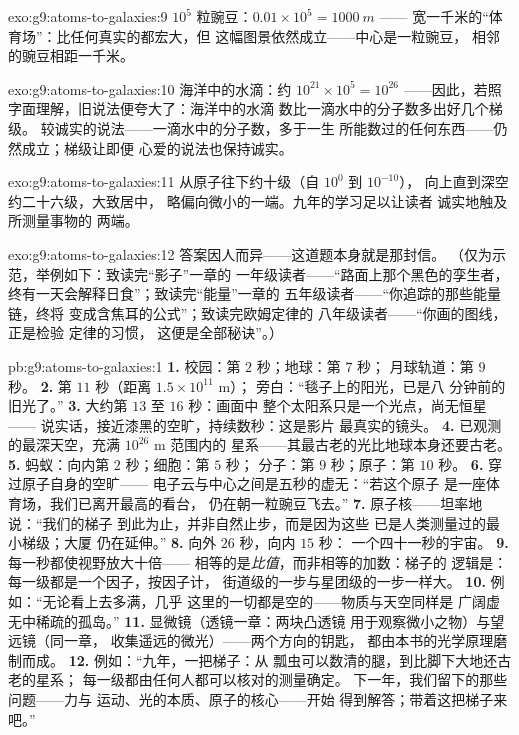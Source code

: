 \begin{solution}{exo:g9:atoms-to-galaxies:9}
$10^{5}$ 粒豌豆：$0.01 \times 10^{5} = \qty{1000}{m}$ ——
宽一千米的“体育场”：比任何真实的都宏大，但
这幅图景依然成立——中心是一粒豌豆，
相邻的豌豆相距一千米。
\end{solution}

\begin{solution}{exo:g9:atoms-to-galaxies:10}
海洋中的水滴：约 $10^{21} \times 10^{5} = 10^{26}$
——因此，若照字面理解，旧说法便夸大了：海洋中的水滴
数比一滴水中的分子数多出好几个梯级。
较诚实的说法——一滴水中的分子数，多于一生
所能数过的任何东西——仍然成立；梯级让即便
心爱的说法也保持诚实。
\end{solution}

\begin{solution}{exo:g9:atoms-to-galaxies:11}
从原子往下约十级（自 $10^{0}$ 到 $10^{-10}$），
向上直到深空约二十六级，大致居中，
略偏向微小的一端。九年的学习足以让读者
诚实地触及所测量事物的
两端。
\end{solution}

\begin{solution}{exo:g9:atoms-to-galaxies:12}
答案因人而异——这道题本身就是那封信。
（仅为示范，举例如下：致读完“影子”一章的
一年级读者——“路面上那个黑色的孪生者，
终有一天会解释日食”；致读完“能量”一章的
五年级读者——“你追踪的那些能量链，终将
变成含焦耳的公式”；致读完欧姆定律的
八年级读者——“你画的图线，正是检验
定律的习惯，
这便是全部秘诀”。）
\end{solution}

\begin{solution}{pb:g9:atoms-to-galaxies:1}
\textbf{1.} 校园：第 $2$ 秒；地球：第 $7$ 秒；
月球轨道：第 $9$ 秒。
\textbf{2.} 第 $11$ 秒（距离 $1.5 \times 10^{11}$ \unit{m}）；
旁白：“毯子上的阳光，已是八
分钟前的旧光了。”
\textbf{3.} 大约第 $13$ 至 $16$ 秒：画面中
整个太阳系只是一个光点，尚无恒星——
说实话，接近漆黑的空旷，持续数秒：这是影片
最真实的镜头。
\textbf{4.} 已观测的最深天空，充满 $10^{26}$ \unit{m} 范围内的
星系——其最古老的光比地球本身还要古老。
\textbf{5.} 蚂蚁：向内第 $2$ 秒；细胞：第 $5$ 秒；
分子：第 $9$ 秒；原子：第 $10$ 秒。
\textbf{6.} 穿过原子自身的空旷——
电子云与中心之间是五秒的虚无：“若这个原子
是一座体育场，我们已离开最高的看台，
仍在朝一粒豌豆飞去。”
\textbf{7.} 原子核——坦率地说：“我们的梯子
到此为止，并非自然止步，而是因为这些
已是人类测量过的最小梯级；大厦
仍在延伸。”
\textbf{8.} 向外 $26$ 秒，向内 $15$ 秒：
一个四十一秒的宇宙。
\textbf{9.} 每一秒都使视野放大十倍——
相等的是\emph{比值}，而非相等的加数：梯子的
逻辑是：每一级都是一个因子，按因子计，
街道级的一步与星团级的一步一样大。
\textbf{10.} 例如：“无论看上去多满，几乎
这里的一切都是空的——物质与天空同样是
广阔虚无中稀疏的孤岛。”
\textbf{11.} 显微镜（透镜一章：两块凸透镜
用于观察微小之物）与望远镜（同一章，
收集遥远的微光）——两个方向的钥匙，
都由本书的光学原理磨制而成。
\textbf{12.} 例如：“九年，一把梯子：从
瓢虫可以数清的腿，到比脚下大地还古老的星系；
每一级都由任何人都可以核对的测量确定。
下一年，我们留下的那些问题——力与
运动、光的本质、原子的核心——开始
得到解答；带着这把梯子来吧。”
\end{solution}
